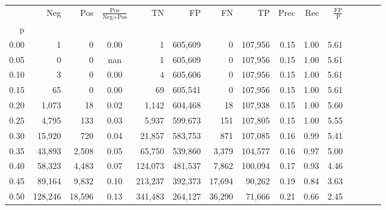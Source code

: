 \begin{tabular}{rrrcrrrrrrrrrrr}
\toprule
{} &      Neg &     Pos & $\frac{\text{Pos}}{\text{Neg}+\text{Pos}}$ &       TN &       FP &       FN &       TP &  Prec &   Rec & $\frac{\text{FP}}{\text{P}}$ \\
p    &          &         &                                            &          &          &          &          &       &       &                              \\
\midrule
0.00 &        1 &       0 &                                       0.00 &        1 &  605,609 &        0 &  107,956 &  0.15 &  1.00 &                         5.61 \\
0.05 &        0 &       0 &                                        nan &        1 &  605,609 &        0 &  107,956 &  0.15 &  1.00 &                         5.61 \\
0.10 &        3 &       0 &                                       0.00 &        4 &  605,606 &        0 &  107,956 &  0.15 &  1.00 &                         5.61 \\
0.15 &       65 &       0 &                                       0.00 &       69 &  605,541 &        0 &  107,956 &  0.15 &  1.00 &                         5.61 \\
0.20 &    1,073 &      18 &                                       0.02 &    1,142 &  604,468 &       18 &  107,938 &  0.15 &  1.00 &                         5.60 \\
0.25 &    4,795 &     133 &                                       0.03 &    5,937 &  599,673 &      151 &  107,805 &  0.15 &  1.00 &                         5.55 \\
0.30 &   15,920 &     720 &                                       0.04 &   21,857 &  583,753 &      871 &  107,085 &  0.16 &  0.99 &                         5.41 \\
0.35 &   43,893 &   2,508 &                                       0.05 &   65,750 &  539,860 &    3,379 &  104,577 &  0.16 &  0.97 &                         5.00 \\
0.40 &   58,323 &   4,483 &                                       0.07 &  124,073 &  481,537 &    7,862 &  100,094 &  0.17 &  0.93 &                         4.46 \\
0.45 &   89,164 &   9,832 &                                       0.10 &  213,237 &  392,373 &   17,694 &   90,262 &  0.19 &  0.84 &                         3.63 \\
0.50 &  128,246 &  18,596 &                                       0.13 &  341,483 &  264,127 &   36,290 &   71,666 &  0.21 &  0.66 &                         2.45 \\

\end{tabular}
